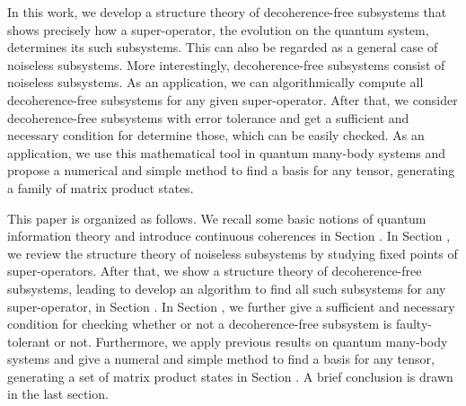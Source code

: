 \documentclass[journal]{IEEEtran}
\begin{document}
In this work,  we develop a structure theory of decoherence-free subsystems that shows precisely how a super-operator, the evolution  on the quantum system,  determines its such subsystems. This can   also be  regarded as a general case of noiseless subsystems. More interestingly, decoherence-free subsystems consist of noiseless subsystems. As an application, we can algorithmically compute all decoherence-free subsystems for any given super-operator. After that, we consider decoherence-free subsystems with error tolerance and get a sufficient and necessary condition for  determine those, which can be easily checked.  
As an application, we use this mathematical tool in quantum many-body systems and propose a numerical and simple method to find a basis for any tensor, generating a family of matrix product states. 

This paper is organized as follows. We recall some basic notions of quantum information theory and introduce continuous coherences in Section \uppercase\expandafter{}. In Section \uppercase\expandafter{}, we review the structure theory of noiseless subsystems by studying fixed points of super-operators. After that, we show a structure theory of decoherence-free subsystems, leading to develop an algorithm to find all such subsystems for any super-operator, in Section \uppercase\expandafter{}. In Section \uppercase\expandafter{}, we further give a sufficient and necessary condition for checking whether or not a decoherence-free subsystem is faulty-tolerant or not. Furthermore, 
we apply previous results on  quantum many-body systems and  give a numeral and simple method to find a basis for any tensor, generating a set of matrix product states in Section \uppercase\expandafter{}. A brief conclusion is drawn in the last section.
\end{document}
